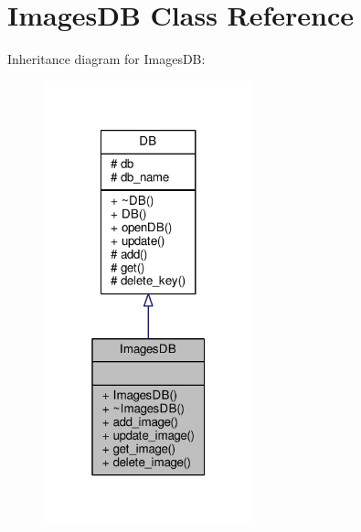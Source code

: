 \hypertarget{classImagesDB}{}\section{Images\+DB Class Reference}
\label{classImagesDB}


Inheritance diagram for Images\+DB\+:\nopagebreak
\begin{figure}[H]
\begin{center}
\leavevmode
\includegraphics[width=172pt]{d6/df9/classImagesDB__inherit__graph}
\end{center}
\end{figure}


